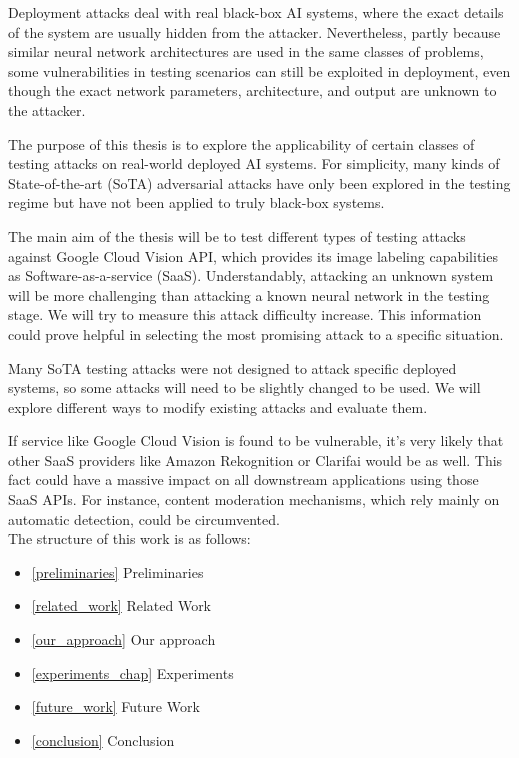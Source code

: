Deployment attacks deal with real black-box AI systems, where the exact details of the system are usually hidden from the attacker. Nevertheless, partly because similar neural network architectures are used in the same classes of problems, some vulnerabilities in testing scenarios can still be exploited in deployment, even though the exact network parameters, architecture, and output are unknown to the attacker.

The purpose of this thesis is to explore the applicability of certain classes of testing attacks on real-world deployed AI systems. For simplicity, many kinds of State-of-the-art (SoTA) adversarial attacks have only been explored in the testing regime but have not been applied to truly black-box systems. 

The main aim of the thesis will be to test different types of testing attacks against Google Cloud Vision API, which provides its image labeling capabilities as Software-as-a-service (SaaS). Understandably, attacking an unknown system will be more challenging than attacking a known neural network in the testing stage. We will try to measure this attack difficulty increase. This information could prove helpful in selecting the most promising attack to a specific situation. 

Many SoTA testing attacks were not designed to attack specific deployed systems, so some attacks will need to be slightly changed to be used. We will explore different ways to modify existing attacks and evaluate them.

If service like Google Cloud Vision is found to be vulnerable, it's very likely that other SaaS providers like Amazon Rekognition or Clarifai would be as well. This fact could have a massive impact on all downstream applications using those SaaS APIs. For instance, content moderation mechanisms, which rely mainly on automatic detection, could be circumvented. \\


The structure of this work is as follows:

\begin{itemize}
    \item \ref{preliminaries} Preliminaries
    \item \ref{related_work} Related Work
    \item \ref{our_approach} Our approach
    \item \ref{experiments_chap} Experiments
    \item \ref{future_work} Future Work
    \item \ref{conclusion} Conclusion

\end{itemize}

